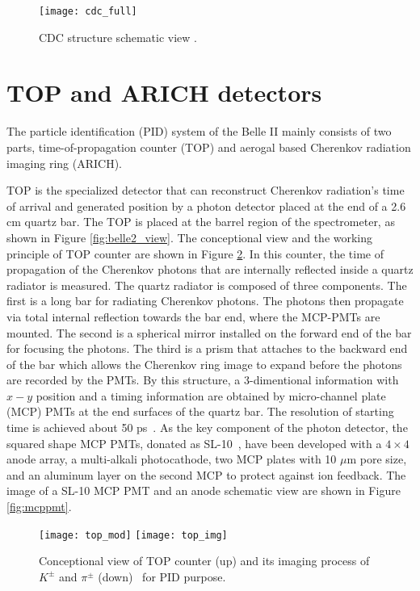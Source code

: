 \begin{figure}[htpb]
	\centering
	\texttt{[image: cdc\_full]}
	\caption{CDC structure schematic view \cite{Abe:2010gxa}.}
	\label{fig:cdc_full}
\end{figure}





\section{TOP and ARICH detectors}
The particle identification (PID) system of the Belle II mainly consists of two parts, time-of-propagation counter (TOP) and aerogal based Cherenkov radiation imaging ring (ARICH).

TOP is the specialized detector that can reconstruct Cherenkov radiation's time of arrival and generated position by a photon detector placed at the end of a 2.6 cm quartz bar. The TOP is placed at the barrel region of the spectrometer, as shown in Figure \ref{fig:belle2_view}. The conceptional view and the working principle of TOP counter are shown in Figure \ref{fig:top}. In this counter, the time of propagation of the Cherenkov photons that are internally
reflected inside a quartz radiator is measured. The quartz radiator is composed of three components. The first is a long bar for radiating Cherenkov photons. The photons then propagate via total internal reflection towards the bar end, where the MCP-PMTs are mounted. The second is a spherical mirror installed on the forward end of the bar for focusing the photons. The third is a prism that attaches to the backward end of the bar which allows the Cherenkov ring image to expand before the photons are recorded by the PMTs. By this structure, a 3-dimentional information with $x-y$ position and a timing information are obtained by micro-channel plate (MCP) PMTs at the end surfaces of the quartz bar.
The resolution of starting time is achieved about 50 ps~\cite{Abe:2010gxa}. As the key component of the photon detector, the squared shape MCP PMTs, donated as SL-10~\cite{inami2008cross}, have been developed with a $4\times 4$ anode array, a multi-alkali photocathode,
two MCP plates with 10 $\mu$m pore size, and an aluminum layer on the second MCP to protect
against ion feedback. The image of a SL-10 MCP PMT and an anode schematic view are shown in Figure \ref{fig:mcppmt}. 

\begin{figure}[htpb]
	\centering
	\texttt{[image: top\_mod]}
	\texttt{[image: top\_img]}
	\caption{Conceptional view of TOP counter (up) and its imaging process of $K^{\pm}$ and $\pi^{\pm}$ (down)~\cite{Abe:2010gxa} for PID purpose.}
	\label{fig:top}
\end{figure}


